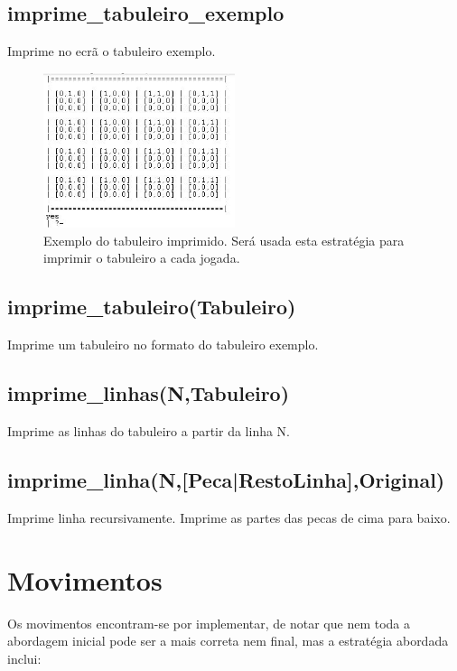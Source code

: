 \documentclass[a4paper]{article}
\begin{document}
\subsection{imprime\_tabuleiro\_exemplo}
Imprime no ecrã o tabuleiro exemplo.

\begin{figure}[h!]
  \centering
      \includegraphics[width=0.5\textwidth]{exemplot}
  \caption{Exemplo do tabuleiro imprimido. Será usada esta estratégia para imprimir o tabuleiro a cada jogada.}
\end{figure}

\subsection{imprime\_tabuleiro(Tabuleiro)}

Imprime um tabuleiro no formato do tabuleiro exemplo.

\subsection{imprime\_linhas(N,Tabuleiro)}

Imprime as linhas do tabuleiro a partir da linha N.

\subsection{imprime\_linha(N,[Peca|RestoLinha],Original)}

Imprime linha recursivamente. Imprime as partes das pecas de cima para baixo.

\section{Movimentos}

Os movimentos encontram-se por implementar, de notar que nem toda a abordagem inicial pode ser a mais correta nem final, mas a estratégia abordada inclui:
\end{document}

